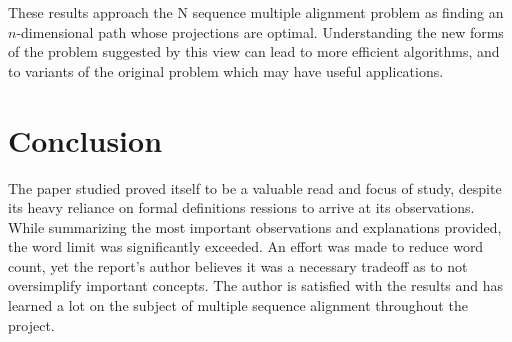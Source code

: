 \documentclass[11pt]{article}
\begin{document}
These results approach the N sequence multiple alignment problem as finding an $n$-dimensional path whose projections are optimal. Understanding the new forms of the problem suggested by this view can lead to more efficient algorithms, and to variants of the original problem which may have useful applications.

\section{Conclusion}
       
The paper studied proved itself to be a valuable read and focus of study, despite its heavy reliance on formal definitions ressions to arrive at its observations. While summarizing the most important observations and explanations provided, the word limit was significantly exceeded. An effort was made to reduce word count, yet the report's author believes it was a necessary tradeoff as to not oversimplify important concepts. The author is satisfied with the results and has learned a lot on the subject of multiple sequence alignment throughout the project.

\end{document}
